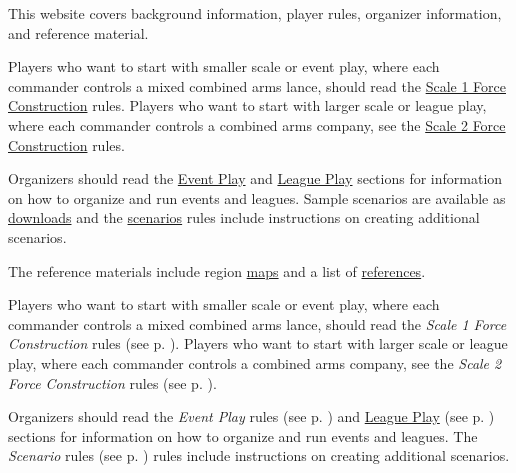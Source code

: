  {
This website covers background information, player rules, organizer information, and reference material.

Players who want to start with smaller scale or event play, where each commander controls a mixed combined arms lance, should read the \hyperref[subsec:force_construction_scale_1]{Scale 1 Force Construction} rules.
Players who want to start with larger scale or league play, where each commander controls a combined arms company, see the \hyperref[subsec:force_construction_scale_2]{Scale 2 Force Construction} rules.

Organizers should read the \hyperref[sec:event_play]{Event Play} and \hyperref[sec:league_play]{League Play} sections for information on how to organize and run events and leagues.
Sample scenarios are available as \hyperref[sec:downloads]{downloads} and the \hyperref[sec:scenarios]{scenarios} rules include instructions on creating additional scenarios.

The reference materials include region \hyperref[sec:outworlds_wastes_map]{maps} and a list of \hyperref[sec:references]{references}.
} {
Players who want to start with smaller scale or event play, where each commander controls a mixed combined arms lance, should read the \emph{Scale 1 Force Construction} rules (see p. \pageref{subsec:force_construction_scale_1}).
Players who want to start with larger scale or league play, where each commander controls a combined arms company, see the \emph{Scale 2 Force Construction} rules (see p. \pageref{subsec:force_construction_scale_2}).

Organizers should read the \emph{Event Play} rules (see p. \pageref{sec:event_play}) and \hyperref[sec:league_play]{League Play} (see p. \pageref{sec:league_play}) sections for information on how to organize and run events and leagues.
The \emph{Scenario} rules (see p. \pageref{sec:scenarios}) rules include instructions on creating additional scenarios.
}
